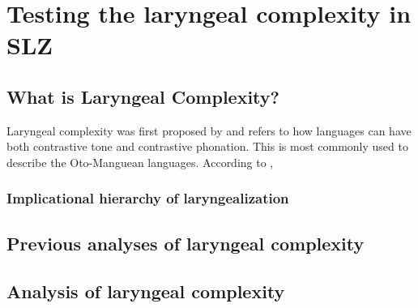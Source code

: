 \chapter{Testing the laryngeal complexity in SLZ} \label{ch:testing_lc}

\section{What is Laryngeal Complexity?}\label{sec:what_is_lc}

Laryngeal complexity was first proposed by \citet{silvermanLaryngealComplexityOtomanguean1997,silvermanPhasingRecoverability1997} and refers to how languages can have both contrastive tone and contrastive phonation. This is most commonly used to describe the Oto-Manguean languages. According to \citet{silvermanLaryngealComplexityOtomanguean1997}, 

\subsection{Implicational hierarchy of laryngealization}\label{sec:implicational_hierarchy}


\section{Previous analyses of laryngeal complexity}\label{sec:previous_analyses}


\section{Analysis of laryngeal complexity}\label{sec:analysis_of_lc}



